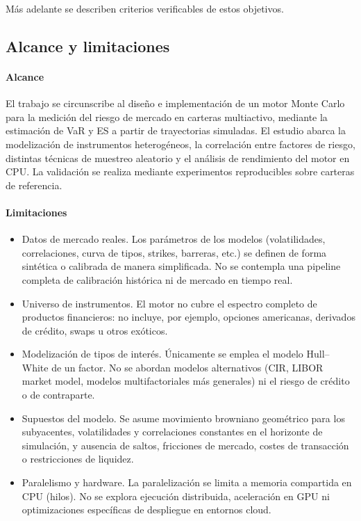 \documentclass[11pt]{article}
\begin{document}
Más adelante se describen criterios verificables de estos objetivos.

\subsection{Alcance y limitaciones}

\paragraph{Alcance}

El trabajo se circunscribe al diseño e implementación de un motor Monte Carlo para la medición del riesgo de mercado en carteras multiactivo, mediante la estimación de VaR y ES a partir de trayectorias simuladas. El estudio abarca la modelización de instrumentos heterogéneos, la correlación entre factores de riesgo, distintas técnicas de muestreo aleatorio y el análisis de rendimiento del motor en CPU. La validación se realiza mediante experimentos reproducibles sobre carteras de referencia.

\paragraph{Limitaciones}

\begin{itemize}
    \item Datos de mercado reales. Los parámetros de los modelos (volatilidades, correlaciones, curva de tipos, strikes, barreras, etc.) se definen de forma sintética o calibrada de manera simplificada. No se contempla una pipeline completa de calibración histórica ni de mercado en tiempo real.
    \item Universo de instrumentos. El motor no cubre el espectro completo de productos financieros: no incluye, por ejemplo, opciones americanas, derivados de crédito, swaps u otros exóticos.
    \item Modelización de tipos de interés. Únicamente se emplea el modelo Hull–White de un factor. No se abordan modelos alternativos (CIR, LIBOR market model, modelos multifactoriales más generales) ni el riesgo de crédito o de contraparte.
    \item Supuestos del modelo. Se asume movimiento browniano geométrico para los subyacentes, volatilidades y correlaciones constantes en el horizonte de simulación, y ausencia de saltos, fricciones de mercado, costes de transacción o restricciones de liquidez.
    \item Paralelismo y hardware. La paralelización se limita a memoria compartida en CPU (hilos). No se explora ejecución distribuida, aceleración en GPU ni optimizaciones específicas de despliegue en entornos cloud.
\end{itemize}
\end{document}
